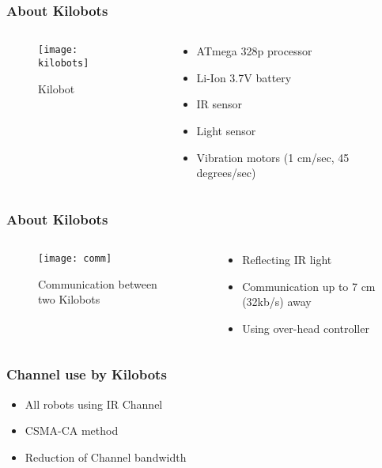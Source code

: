 \begin{frame}
	\frametitle{About Kilobots}
	\begin{columns}
		\begin{column}{0.4\textwidth}
			\begin{figure}
				\centering
				\texttt{[image: kilobots]}
				\caption{Kilobot}
			\end{figure}
		\end{column}
						
		\begin{column}{0.45\textwidth}
			\begin{itemize}
				\item ATmega 328p processor 
				\item Li-Ion 3.7V battery 
				\item IR sensor 
				\item Light sensor 
				\item Vibration motors (1 cm/sec, 45 degrees/sec)
			\end{itemize}
		\end{column}
	\end{columns}
\end{frame}

\begin{frame}
	\frametitle{About Kilobots}
	\begin{columns}
		\begin{column}{0.4\textwidth}
			\begin{figure}
				\centering
				\texttt{[image: comm]}
				\caption{Communication between two Kilobots}
			\end{figure}
		\end{column}
						
		\begin{column}{0.45\textwidth}
			\begin{itemize}
				\item Reflecting IR light
				\item Communication up to 7 cm (32kb/s) away 
				\item Using over-head controller
			\end{itemize}
		\end{column}
	\end{columns}
\end{frame}

\begin{frame}
	\frametitle{Channel use by Kilobots}
	\begin{itemize}
		\item All robots using IR Channel
		\item CSMA-CA method 
		\item Reduction of Channel bandwidth        
	\end{itemize}
\end{frame}
